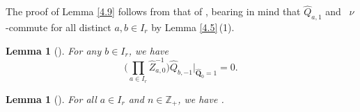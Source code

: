 \documentclass[10pt,a4paper]{amsart}
\numberwithin{equation}{section}
\newtheorem{Lemma}[Theorem]{Lemma}
\begin{document}
The proof of Lemma \ref{4.9} follows from that of \cite[Lemma 5.9]{DFK14}, bearing in mind that $\widehat{Q}_{a,1}$ and~ $\nu$-commute for all distinct $a,b\in I_r$ by Lemma \ref{4.5}\,(1).

\begin{Lemma}[{\cite[Lemma 5.12]{DFK14}}]\label{4.10}
For any $b\in I_r$, we have
\begin{equation*}
\biggl(\prod_{a\in I_r}\widehat{Z}_{a,0}^{-1}\biggr)\widehat{Q}_{b,-1}\biggl|_{\widehat{\mathbf{Q}}_0=1}=0.
\end{equation*}
\end{Lemma}

\begin{Lemma}[{\cite[Lemma 5.14]{DFK14}}]\label{4.11}
For all $a\in I_r$ and $n\in\mathbb{Z}_+$, we have .
\end{Lemma}
\end{document}
